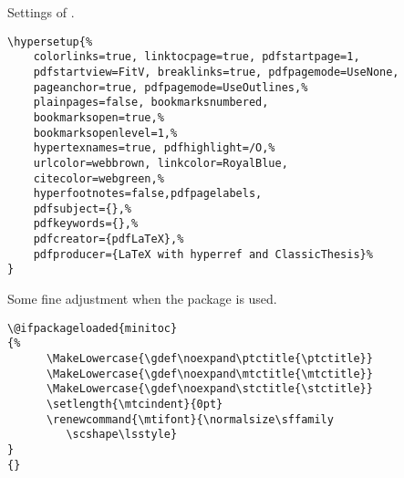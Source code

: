 Settings of .
\begin{lstlisting}
\hypersetup{%
    colorlinks=true, linktocpage=true, pdfstartpage=1, 
    pdfstartview=FitV, breaklinks=true, pdfpagemode=UseNone, 
    pageanchor=true, pdfpagemode=UseOutlines,%
    plainpages=false, bookmarksnumbered,
    bookmarksopen=true,%
    bookmarksopenlevel=1,%
    hypertexnames=true, pdfhighlight=/O,%
    urlcolor=webbrown, linkcolor=RoyalBlue, 
    citecolor=webgreen,%
    hyperfootnotes=false,pdfpagelabels,
    pdfsubject={},%
    pdfkeywords={},%
    pdfcreator={pdfLaTeX},%
    pdfproducer={LaTeX with hyperref and ClassicThesis}%
}
\end{lstlisting}



Some fine adjustment when the  package is used.
\begin{lstlisting}
\@ifpackageloaded{minitoc} 
{% 
      \MakeLowercase{\gdef\noexpand\ptctitle{\ptctitle}} 
      \MakeLowercase{\gdef\noexpand\mtctitle{\mtctitle}} 
      \MakeLowercase{\gdef\noexpand\stctitle{\stctitle}} 
      \setlength{\mtcindent}{0pt} 
      \renewcommand{\mtifont}{\normalsize\sffamily 
         \scshape\lsstyle} 
} 
{}
\end{lstlisting}



